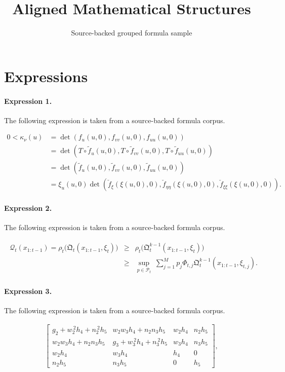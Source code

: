 \documentclass[11pt]{article}
\title{Aligned Mathematical Structures}
\author{Source-backed grouped formula sample}
\date{}
\begin{document}
\maketitle
\section{Expressions}
\paragraph{Expression 1.} The following expression is taken from a source-backed formula corpus.

\begin{align*} 0<\kappa_\nu(u) &=\det(f_u(u,0),f_{vv}(u,0),f_{uu}(u,0)) \\ &=\det(T \circ \tilde f_u(u,0),T \circ \tilde f_{vv}(u,0), T \circ \tilde f_{uu}(u,0))\\ &=\det(\tilde f_u(u,0),\tilde f_{vv}(u,0),\tilde f_{uu}(u,0))\\ &=\xi_u(u,0) \det(\check f_\xi(\xi(u,0),0), \check f_{\eta\eta}(\xi(u,0),0), \check f_{\xi\xi}(\xi(u,0),0)).\end{align*}

\paragraph{Expression 2.} The following expression is taken from a source-backed formula corpus.

\begin{align*}\begin{array}{lll}\mathcal{Q}_{t}(x_{1:t-1})=\rho_t\Big( \mathfrak{Q}_{t}(x_{1:t-1}, \xi_t) \Big) & \geq & \rho_t \Big( \mathfrak{Q}_{t}^{k-1}(x_{1:t-1}, \xi_t) \Big)\\& \geq & \displaystyle \sup_{p \in \mathcal{P}_t} \;\displaystyle \sum_{j=1}^{M} p_j \Phi_{t, j} \mathfrak{Q}_{t}^{k-1}(x_{1:t-1}, \xi_{t, j}).\end{array}\end{align*}

\paragraph{Expression 3.} The following expression is taken from a source-backed formula corpus.

\begin{align*}\left[\begin{array}{cccc}g_{2}+w_{2}^{\ 2}h_{4}+n_{2}^{\ 2}h_{5} & w_{2}w_{3}h_{4}+n_{2}n_{3}h_{5} &w_{2}h_{4} & n_{2}h_{5} \\w_{2}w_{3}h_{4}+n_{2}n_{3}h_{5} & g_{3}+w_{3}^{\ 2}h_{4}+n_{3}^{\ 2}h_{5} &w_{3}h_{4} & n_{3}h_{5} \\w_{2}h_{4} & w_{3}h_{4} & h_{4} & 0 \\n_{2}h_{5} & n_{3}h_{5} & 0 & h_{5}\end{array}\right] , \end{align*}
\end{document}
